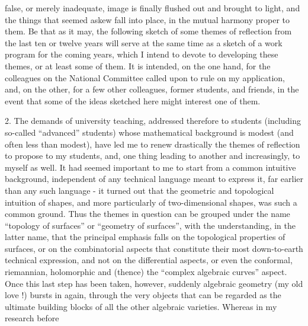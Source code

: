 
false, or merely inadequate, image is finally flushed out
and brought to light, and the things that seemed askew
fall into place, in the mutual harmony proper to them.
\qquad Be that as it may, the following sketch of some
themes of reflection from the last ten or twelve years will
serve at the same time as a sketch of a work program for the
coming years, which I intend to devote to developing
these themes, or at least some of them. It is intended,
on the one hand, for the colleagues on the National Committee called upon to rule
on my application,
and, on the other, for a few other colleagues, former
students, and friends, in the event that some of the ideas sketched
here might interest one of them.

2. \qquad The demands of university teaching, addressed
therefore to students (including so-called ``advanced'' students) whose
mathematical background is modest (and often less than modest), have led me
to renew drastically the themes of reflection to propose
to my students, and, one thing leading to another and increasingly, to myself
as well. It had seemed important to me to start from a common
intuitive background, independent of any technical language meant to express it,
far earlier than any such language - it turned out that the geometric
and topological intuition of shapes, and more particularly of
two-dimensional shapes, was such a common ground. Thus the themes in question
can be grouped under the name ``topology of surfaces'' or
``geometry of surfaces'', with the understanding, in the latter name,
that the principal emphasis falls on the topological properties
of surfaces, or on the combinatorial aspects that constitute
their most down-to-earth technical expression, and not on the differential
aspects, or even the conformal, riemannian, holomorphic and (thence)
the ``complex algebraic curves'' aspect. Once this last step
has been taken, however, suddenly algebraic geometry (my old
love !) bursts in again, through the very objects that
can be regarded as the ultimate building blocks of all
the other algebraic varieties. Whereas in my research before


